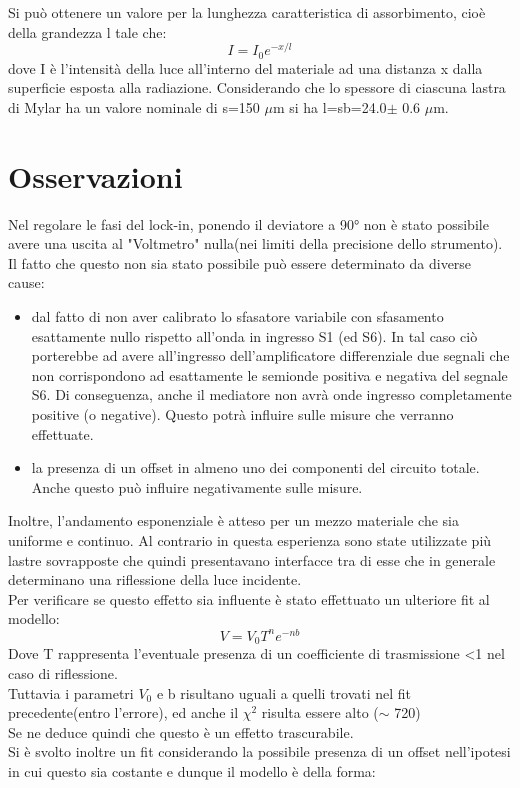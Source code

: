 Si può ottenere un valore per la lunghezza caratteristica di assorbimento, cioè della grandezza l tale che:
\begin{equation}
I=I_{0}e^{-x/l}
\end{equation}
dove I è l'intensità della luce all'interno del materiale ad una distanza x dalla superficie esposta alla radiazione.
Considerando che lo spessore di ciascuna lastra di Mylar ha un valore nominale di s=150 $\mu$m si ha l=sb=24.0$ \pm$ 0.6 $\mu$m.

\section{Osservazioni}
Nel regolare le fasi del lock-in, ponendo il deviatore a 90° non è stato possibile avere una uscita al "Voltmetro" nulla(nei limiti della precisione dello strumento).\\
Il fatto che questo non sia stato possibile può essere determinato da diverse cause:
\begin{itemize}
\item dal fatto di non aver calibrato lo sfasatore variabile con sfasamento esattamente nullo rispetto all'onda in ingresso S1 (ed S6).
In tal caso ciò porterebbe ad avere all'ingresso dell'amplificatore differenziale due segnali che non corrispondono ad esattamente le semionde positiva e negativa del segnale S6. Di conseguenza, anche il mediatore non avrà onde ingresso completamente positive (o negative). Questo potrà influire sulle misure che verranno effettuate.\\
\item la presenza di un offset in almeno uno dei componenti del circuito totale. Anche questo può influire negativamente sulle misure.
\end{itemize} 
Inoltre, l'andamento esponenziale è atteso per un mezzo materiale che sia uniforme e continuo. Al contrario in questa esperienza sono state utilizzate più lastre sovrapposte che quindi presentavano interfacce tra di esse che in generale determinano una riflessione della luce incidente.\\
Per verificare se questo effetto sia influente è stato effettuato un ulteriore fit al modello:
\begin{equation}
V=V_{0}T^{n}e^{-nb}
\end{equation}
Dove T rappresenta l'eventuale presenza di un coefficiente di trasmissione <1 nel caso di riflessione.\\
Tuttavia i parametri $V_{0}$ e b risultano uguali a quelli trovati nel fit precedente(entro l'errore), ed anche il $\chi^{2}$ risulta essere alto ($\sim$ 720)\\
Se ne deduce quindi che questo è un effetto trascurabile.\\
Si è svolto inoltre un fit considerando la possibile presenza di un offset nell'ipotesi in cui questo sia costante e dunque il modello è della forma:

